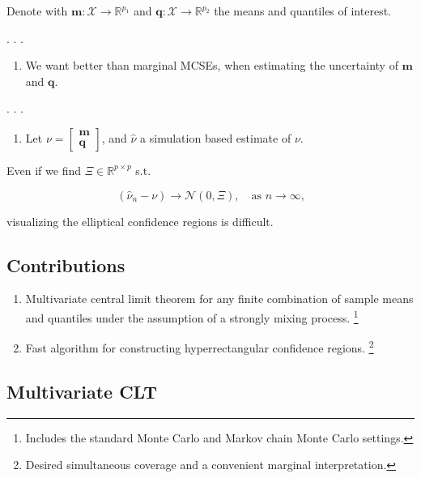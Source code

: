 \documentclass[
  letterpaper,
  DIV=11,
  numbers=noendperiod]{scrartcl}
\providecommand{\tightlist}{%
  \setlength{\itemsep}{0pt}\setlength{\parskip}{0pt}}\usepackage{longtable,booktabs,array}
\begin{document}
Denote with \(\mathbf{m}:\mathcal X \to \mathbb R^{p_1}\) and
\(\mathbf{q} : \mathcal X \to \mathbb R ^{p_2}\) the means and quantiles
of interest.

. . .

\begin{enumerate}
\def\labelenumi{\arabic{enumi}.}
\tightlist
\item
  We want better than marginal MCSEs, when estimating the uncertainty of
  \(\mathbf m\) and \(\mathbf q\).
\end{enumerate}

. . .

\begin{enumerate}
\def\labelenumi{\arabic{enumi}.}
\setcounter{enumi}{1}
\tightlist
\item
  Let \(\nu = \begin{bmatrix}\mathbf m\\\mathbf q\end{bmatrix}\), and
  \(\hat\nu\) a simulation based estimate of \(\nu\).
\end{enumerate}

Even if we find \(\Xi\in \mathbb R ^{p \times p}\) s.t.

\[(\hat\nu_n - \nu) \to \mathcal N(0, \Xi), \quad \text{as $n \to \infty$,}\]

visualizing the elliptical confidence regions is difficult.

\hypertarget{contributions}{%
\subsection{Contributions}\label{contributions}}

\begin{enumerate}
\def\labelenumi{\arabic{enumi}.}
\item
  Multivariate central limit theorem for any finite combination of
  sample means and quantiles under the assumption of a strongly mixing
  process. \footnote{Includes the standard Monte Carlo and Markov chain
    Monte Carlo settings.}
\item
  Fast algorithm for constructing hyperrectangular confidence regions.
  \footnote{Desired simultaneous coverage and a convenient marginal
    interpretation.}
\end{enumerate}

\hypertarget{multivariate-clt}{%
\subsection{Multivariate CLT}\label{multivariate-clt}}
\end{document}
